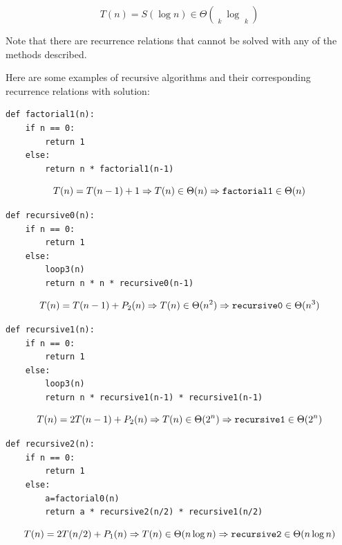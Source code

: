 \documentclass[justified, sixbynine]{tufte-book}
\def\stackunder#1#2{\mathrel{\mathop{#2}\limits_{#1}}}
\theoremstyle{plain}%
\newtheorem * {corollary}{Corollary}
\theoremstyle{definition}
\theoremstyle{remark}
\newtheorem * {remark}{Remark}
\newtheorem * {note}{Note}
\begin{document}
\begin{fullwidth}
\begin{equation}
T(n)=S(\log n)\in \Theta (\stackunder{k}{\underbrace{\log n}}\log
\stackunder{k}{\underbrace{\log n}})
\end{equation}

Note that there are recurrence relations that cannot be solved with any of
the methods described.

Here are some examples of recursive algorithms and their corresponding recurrence relations with solution:

\begin{lstlisting}
def factorial1(n):
    if n == 0:
        return 1
    else:
        return n * factorial1(n-1)
\end{lstlisting}

\begin{equation}
T(n)=T(n-1)+1\Rightarrow T(n)\in \Theta (n)\Rightarrow \text{{\tt factorial1}%
}\in \Theta (n)
\end{equation}

\begin{lstlisting}
def recursive0(n):
    if n == 0:
        return 1
    else:
        loop3(n)
        return n * n * recursive0(n-1)
\end{lstlisting}

\begin{equation}
T(n)=T(n-1)+P_2(n)\Rightarrow T(n)\in \Theta (n^2)\Rightarrow \text{{\tt %
recursive0}}\in \Theta (n^3)
\end{equation}

\begin{lstlisting}
def recursive1(n):
    if n == 0:
        return 1
    else:
        loop3(n)
        return n * recursive1(n-1) * recursive1(n-1)
\end{lstlisting}

\begin{equation}
T(n)=2T(n-1)+P_2(n)\Rightarrow T(n)\in \Theta (2^n)\Rightarrow \text{{\tt %
recursive1}}\in \Theta (2^n)
\end{equation}

\begin{lstlisting}
def recursive2(n):
    if n == 0:
        return 1
    else:
        a=factorial0(n)
        return a * recursive2(n/2) * recursive1(n/2)
\end{lstlisting}

\begin{equation}
T(n) = 2 T(n/2) + P_1(n) \Rightarrow T(n)\in \Theta (n\log n)\Rightarrow \text{%
{\tt recursive2}}\in \Theta (n\log n)
\end{equation}


\end{fullwidth}
\end{document}
